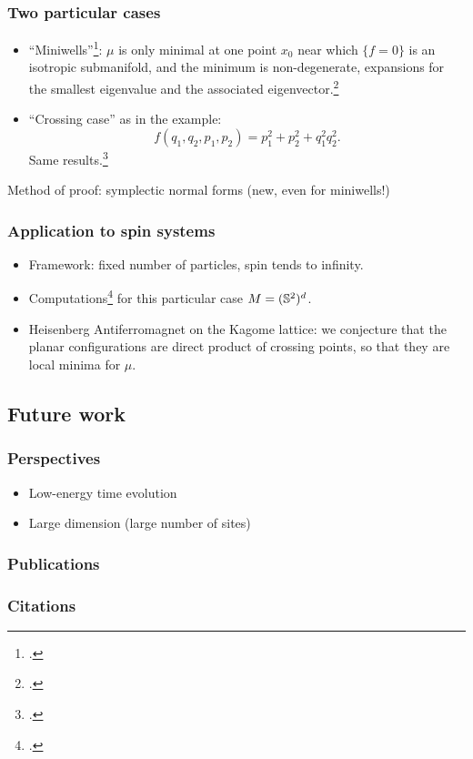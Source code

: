 \documentclass[mathserif]{beamer}
\begin{document}
\begin{frame}
  \frametitle{Two particular cases}
  \begin{itemize}
  \item ``Miniwells''\footcite{helffer_puits_1986}: $\mu$ is only minimal at one point $x_0$ near which $\{f=0\}$ is
    an isotropic submanifold, and the minimum is non-degenerate,
    expansions for the smallest eigenvalue and the associated
    eigenvector.\footcite{deleporte_low-energy_2017}
  \item ``Crossing case'' as in the example:
    \[
      f(q_1,q_2,p_1,p_2)=p_1^2+p_2^2+q_1^2q_2^2.
      \]
    Same results.\footcite{deleporte_low-energy_2017}
  \end{itemize}
  Method of proof: symplectic normal forms (new, even for miniwells!)
\end{frame}

\begin{frame}
  \frametitle{Application to spin systems}
  \begin{itemize}
\item  Framework: fixed number of particles, spin tends to infinity.

  \item<2->{Computations\footcite{deleporte_quantum_2018} for this particular case
    $M=(\S^2)^d$.}

  \item<3>{Heisenberg Antiferromagnet on the Kagome lattice: we
    conjecture that the planar configurations are direct product of
    crossing points, so that they are local minima for $\mu$.}
  \end{itemize}
\end{frame}

\subsection{Future work}
\begin{frame}
  \frametitle{Perspectives}
    \begin{itemize}
    \item Low-energy time evolution
    \item Large dimension (large number of sites)
    \end{itemize}
  \end{frame}

  \begin{frame}
    \frametitle{Publications}
    \printbibliography[keyword=Deleporte,heading=none]
  \end{frame}

  \begin{frame}[allowframebreaks]
    \frametitle{Citations}
    \printbibliography[notkeyword=Deleporte,heading=none]
  \end{frame}
\end{document}
